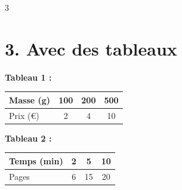 \documentclass[a4paper]{book}
\begin{document}
{\begin{exerciceNote}{3}
\begin{minipage}{0.30\linewidth}
            \dotfill 
            
            \medskip 
            
            \dotfill

            \medskip 
            
            \dotfill
        \end{minipage}

        \section*{3. Avec des tableaux}

        \begin{minipage}{0.45\linewidth}
            \begin{center}
                \textbf{Tableau 1 :} \begin{tabular}{|l|c|c|c|} 
                \hline Masse (g) & 100 & 200 & 500 \\ 
                \hline Prix (€) & 2 & 4 & 10 \\ \hline 
                \end{tabular}
            \end{center}

            \medskip

            \dotfill

            \medskip

            \dotfill
                                    
            \medskip 
            
            \dotfill
        \end{minipage}
        \hfill\vline\hfill
        \begin{minipage}{0.45\linewidth}
            \begin{center}
                \textbf{Tableau 2 :} \begin{tabular}{|l|c|c|c|} 
                \hline Temps (min) & 2 & 5 & 10 \\ 
                \hline Pages & 6 & 15 & 20 \\ \hline 
                \end{tabular}
            \end{center}

            \medskip
            
            \dotfill 
            
            \medskip 
            
            \dotfill
                        

\end{minipage}
\end{exerciceNote}}
\end{document}
